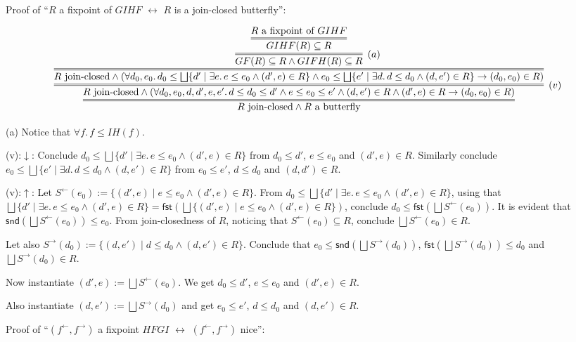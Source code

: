 \documentclass[9pt]{article}
\newcommand{\ff}{{f^{\rightarrow}}}
\newcommand{\fb}{{f^{\leftarrow}}}
\newcommand{\bigjoin}{\bigsqcup}
\newcommand{\con}{\wedge}
\newcommand{\imp}{\to}
\newcommand{\equ}{\leftrightarrow}
\newcommand{\fst}{\mathsf{fst}}
\newcommand{\snd}{\mathsf{snd}}
\begin{document}
\bigskip


Proof of ``$R$ a fixpoint of $GIHF$ $\equ$ $R$ is a join-closed butterfly'':

\[
\infer={R \textrm{~join-closed} \con R \textrm{~a butterfly}}{
  \infer=[(v)]{R \textrm{~join-closed} \con (\forall d_0,e_0,d,d',e,e'.\, 
        d \leq d_0 \leq d' \con e \leq e_0 \leq e'
           \con (d,e') \in R \con (d',e) \in R \imp (d_0,e_0) \in R)}{    
           \infer={R \textrm{~join-closed} \con (\forall d_0,e_0.\, d_0 \leq \bigjoin \{d' \mid \exists e.\, e \leq e_0 \con (d',e) \in R\} \con e_0 \leq \bigjoin \{e' \mid \exists d.\, d \leq d_0 \con (d,e') \in R\} \imp (d_0,e_0) \in R)}{
        \infer=[(a)]{GF(R) \subseteq R \con GIFH(R) \subseteq R}{        
          \infer={GIHF(R) \subseteq R}{
            R \textrm{~a fixpoint of $GIHF$}
          }  
        }
     }  
  }
}  
\]

(a) Notice that $\forall f.\, f \leq IH(f)$. 

(v):$\downarrow$: Conclude
$d_0 \leq \bigjoin \{d' \mid \exists e.\, e \leq e_0 \con (d',e)
\in R\}$ from $d_0 \leq d'$, $e \leq e_0$ and $(d',e) \in R$.
Similarly conclude
$e_0 \leq \bigjoin \{e' \mid \exists d.\, d \leq d_0 \con (d,e')
\in R\}$ from $e_0 \leq e'$, $d \leq d_0$ and $(d, d') \in R$.

\newcommand{\Sb}{S^\leftarrow}
\newcommand{\Sf}{S^\rightarrow}

(v):$\uparrow$: Let
$\Sb(e_0) := \{(d',e) \mid e \leq e_0 \con (d', e) \in R\}$. From
$d_0 \leq \bigjoin \{d' \mid \exists e.\, e \leq e_0 \con (d',e)
\in R\}$, using that
$\bigjoin \{d' \mid \exists e.\, e \leq e_0 \con (d',e) \in R\}
= \fst (\bigjoin \{(d',e) \mid e \leq e_0 \con (d', e) \in
R\})$, conclude $d_0 \leq \fst(\bigjoin \Sb(e_0))$. It is evident that
$\snd(\bigjoin \Sb(e_0)) \leq e_0$. From join-closedness of $R$, noticing that
$\Sb(e_0) \subseteq R$, conclude $\bigjoin \Sb(e_0) \in R$.

Let also $\Sf(d_0) := \{(d,e') \mid d \leq d_0 \con (d, e') \in R\}$.
Conclude that $e_0 \leq \snd(\bigjoin \Sf(d_0))$, $\fst(\bigjoin \Sf(d_0)) \leq d_0$ and
$\bigjoin \Sf(d_0) \in R$.

Now instantiate $(d',e) := \bigjoin \Sb(e_0)$. We get $d_0 \leq d'$, $e
\leq e_0$ and $(d',e) \in R$.

Also instantiate $(d, e') := \bigjoin \Sf(d_0)$ and get $e_0 \leq
e'$, $d \leq d_0$ and $(d, e') \in R$. 


\bigskip


Proof of ``$(\fb,\ff)$ a fixpoint $HFGI$ $\equ$ $(\fb,\ff)$ nice'':
\end{document}
